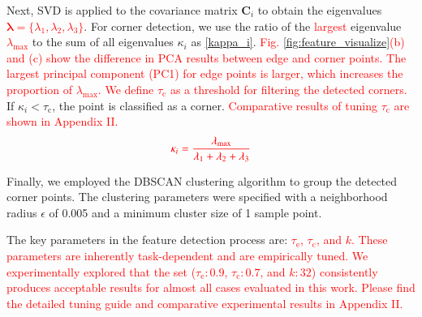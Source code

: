 \documentclass[journal]{IEEEtran}
\newcommand{\rev}[1]{\textcolor{red}{#1}}
\begin{document}
Next, SVD is applied to the covariance matrix \( \mathbf{C}_i \) to obtain the eigenvalues \rev{$\boldsymbol{\lambda} = \{\lambda_1, \lambda_2, \lambda_3\}$}. For corner detection, we use the ratio of the \rev{largest} eigenvalue \rev{$\lambda_{\max}$} to the sum of all eigenvalues \( \kappa_i\) as \cref{kappa_i}. \rev{Fig. \ref{fig:feature_visualize}(b) and (c) show the difference in PCA results between edge and corner points. The largest principal component (PC1) for edge points is larger, which increases the proportion of $\lambda_{\max}$. We define $\tau_\text{c}$ as a threshold for filtering the detected corners.} If $\kappa_i < \tau_\text{c}$, the point is classified as a corner. \rev{Comparative results of tuning $\tau_\text{c}$ are shown in Appendix II.}
\begin{equation}
\rev{
    \kappa_i = \frac{\lambda_{\max}}{\lambda_1 + \lambda_2 + \lambda_3}
    \label{kappa_i}
    }
\end{equation}

Finally, we employed the DBSCAN clustering algorithm to group the detected corner points. The clustering parameters were specified with a neighborhood radius $\epsilon$ of 0.005 and a minimum cluster size of 1 sample point.

The key parameters in the feature detection process are: \rev{$\tau_\text{e}$, $\tau_\text{c}$, and $k$. These parameters are inherently task-dependent and are empirically tuned. We experimentally explored that the set ($\tau_\text{e}:0.9$, $\tau_\text{c}:0.7$, and $k:32$) consistently produces acceptable results for almost all cases evaluated in this work. Please find the detailed tuning guide and comparative experimental results in Appendix II.}


\end{document}
